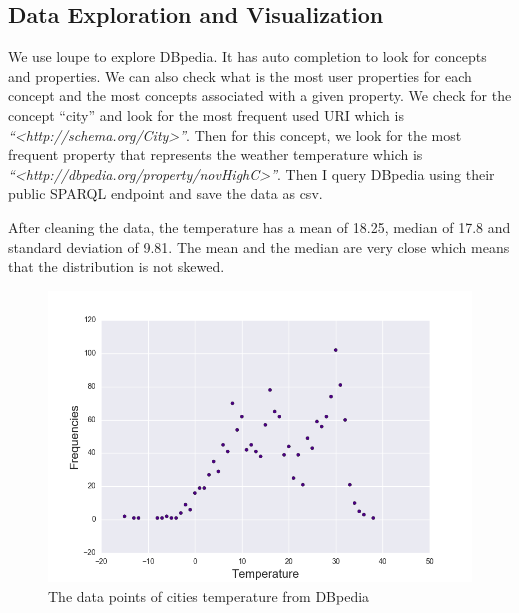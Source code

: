 \documentclass{article}
\begin{document}
\subsection{Data Exploration and Visualization}
We use loupe \cite{loupe} to explore DBpedia. It has auto completion to look for concepts and properties. We can also check what is the most user properties for each concept and the most concepts associated with a given property. We check for the concept ``city'' and look for the most frequent used URI which is \textit{``\textless http://schema.org/City\textgreater ''}. Then for this concept, we look for the most frequent property that represents the weather temperature which is \textit{``\textless http://dbpedia.org/property/novHighC\textgreater''}. Then I query DBpedia using their public SPARQL endpoint and save the data as csv. 

After cleaning the data, the temperature has a mean of 18.25, median of 17.8 and standard deviation of 9.81. The mean and the median are very close which means that the distribution is not skewed. 

\begin{figure}[!ht]
  \caption{The data points of cities temperature from DBpedia}
  \centering
    \includegraphics[width=1.0\textwidth]{tempscatt}
\end{figure}
\end{document}
